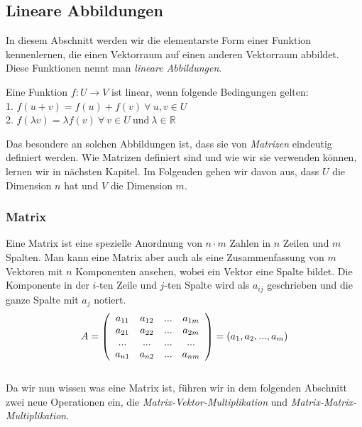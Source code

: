\subsection{Lineare Abbildungen}
In diesem Abschnitt werden wir die elementarste Form einer Funktion kennenlernen, die einen Vektorraum auf einen anderen Vektorraum abbildet. Diese Funktionen nennt man \textit{lineare Abbildungen}.
\begin{Def}
	\label{Def:Def_1}
Eine Funktion $f:U \stackrel{}{\rightarrow} V$ ist linear, wenn folgende Bedingungen gelten: \\ 
1. $f(u+v) = f(u)+f(v) \ \forall \ u,v \in U$\\
2. $f(\lambda v) = \lambda f(v) \ \forall \ v \in U \ \text{und} \ \lambda \in \mathbb{R}$
\end{Def}

Das besondere an solchen Abbildungen ist, dass sie von \textit{Matrizen} eindeutig definiert werden. Wie Matrizen definiert sind und wie wir sie verwenden können, lernen wir in nächsten Kapitel. Im Folgenden gehen wir davon aus, dass $U$ die Dimension $n$ hat und $V$ die Dimension $m$. 

\subsubsection{Matrix}
Eine Matrix ist eine spezielle Anordnung von $n\cdot m$ Zahlen in $n$ Zeilen und $m$ Spalten. Man kann eine Matrix aber auch als eine Zusammenfassung von $m$ Vektoren mit $n$ Komponenten ansehen, wobei ein Vektor eine Spalte bildet. Die Komponente in der $i$-ten Zeile und $j$-ten Spalte wird als $a_{ij}$ geschrieben und die ganze Spalte mit $a_j$ notiert.\\
\begin{equation*}
A= \left(
   \begin{array}{cccc}
	  a_{11} & a_{12} & ... & a_{1m}\\
		a_{21} & a_{22} & ... & a_{2m}\\
		...   & ...   & ... & ...  \\
		a_{n1} & a_{n2} & ... & a_{nm}
	 \end{array}
	 \right) = (a_1, a_2, ..., a_m)\\
\end{equation*}
\\
Da wir nun wissen was eine Matrix ist, führen wir in dem folgenden Abschnitt zwei neue Operationen ein, die \textit{Matrix-Vektor-Multiplikation} und \textit{Matrix-Matrix-Multiplikation}.

